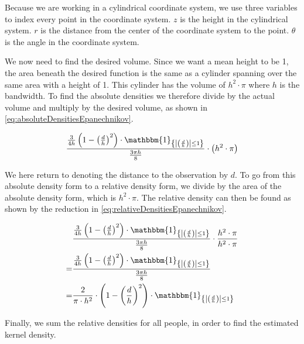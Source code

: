 Because we are working in a cylindrical coordinate system, we use three variables to index every point in the coordinate system. $z$ is the height in the cylindrical system. $r$ is the distance from the center of the coordinate system to the point. $\theta$ is the angle in the coordinate system.

We now need to find the desired volume. Since we want a mean height to be 1, the area beneath the desired function is the same as a cylinder spanning over the same area with a height of 1. This cylinder has the volume of $h^2 \cdot \pi$ where $h$ is the bandwidth. To find the absolute densities we therefore divide by the actual volume and multiply by the desired volume, as shown in \cref{eq:absoluteDensitiesEpanechnikov}.

\begin{equation}
\label{eq:absoluteDensitiesEpanechnikov}
\frac{\frac{3}{4 h} \left(1 - \left(\frac{d}{h}\right)^2\right) \cdot \mathbbm{1}_{\left\{\left|\left(\frac{d}{h}\right)\right| \leq 1\right\}}}{\frac{3\pi h}{8}} \cdot \left(h^2 \cdot \pi\right)
\end{equation}

We here return to denoting the distance to the observation by $d$. To go from this absolute density form to a relative density form, we divide by the area of the absolute density form, which is $h^2 \cdot \pi$. The relative density can then be found as shown by the reduction in \cref{eq:relativeDensitiesEpanechnikov}.

\begin{equation}
\label{eq:relativeDensitiesEpanechnikov}
\begin{split}
&\frac{\frac{3}{4 h} \left(1 - \left(\frac{d}{h}\right)^2\right) \cdot \mathbbm{1}_{\left\{\left|\left(\frac{d}{h}\right)\right| \leq 1\right\}}}{\frac{3 \pi h}{8}} \cdot \frac{h^2 \cdot \pi}{h^2 \cdot \pi}\\
= &\frac{\frac{3}{4 h} \left(1 - \left(\frac{d}{h}\right)^2\right) \cdot \mathbbm{1}_{\left\{\left|\left(\frac{d}{h}\right)\right| \leq 1\right\}}}{\frac{3 \pi h}{8}}\\
= &\frac{2}{\pi \cdot h^2} \cdot \left(1-\left(\frac{d}{h}\right)^2\right) \cdot \mathbbm{1}_{\left\{\left|\left(\frac{d}{h}\right)\right| \leq 1\right\}}
\end{split}
\end{equation}

Finally, we sum the relative densities for all people, in order to find the estimated kernel density.

